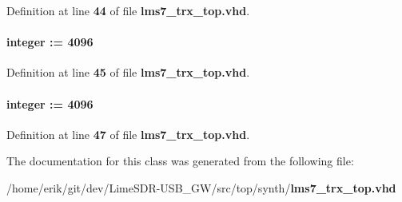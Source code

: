 Definition at line {\bf 44} of file {\bf lms7\+\_\+trx\+\_\+top.\+vhd}.

\paragraph[{T\+X\+\_\+\+P\+C\+T\+\_\+\+S\+I\+ZE}]{ {\bfseries \textcolor{vhdlchar}{ }} {\bfseries \textcolor{comment}{integer}\textcolor{vhdlchar}{ }\textcolor{vhdlchar}{ }\textcolor{vhdlchar}{\+:}\textcolor{vhdlchar}{=}\textcolor{vhdlchar}{ }\textcolor{vhdlchar}{ } \textcolor{vhdldigit}{4096} \textcolor{vhdlchar}{ }} \hspace{0.3cm}{\ttfamily [Generic]}}\label{classlms7__trx__top_a66ae1078241f8e31b80f57172b8d57d2}


Definition at line {\bf 45} of file {\bf lms7\+\_\+trx\+\_\+top.\+vhd}.

\paragraph[{W\+F\+M\+\_\+\+I\+N\+F\+I\+F\+O\+\_\+\+S\+I\+ZE}]{ {\bfseries \textcolor{vhdlchar}{ }} {\bfseries \textcolor{comment}{integer}\textcolor{vhdlchar}{ }\textcolor{vhdlchar}{ }\textcolor{vhdlchar}{\+:}\textcolor{vhdlchar}{=}\textcolor{vhdlchar}{ }\textcolor{vhdlchar}{ } \textcolor{vhdldigit}{4096} \textcolor{vhdlchar}{ }} \hspace{0.3cm}{\ttfamily [Generic]}}\label{classlms7__trx__top_ac82373300c96c816545ec5bc59aa19ba}


Definition at line {\bf 47} of file {\bf lms7\+\_\+trx\+\_\+top.\+vhd}.



The documentation for this class was generated from the following file\+:\begin{DoxyCompactItemize}
\item 
/home/erik/git/dev/\+Lime\+S\+D\+R-\/\+U\+S\+B\+\_\+\+G\+W/src/top/synth/{\bf lms7\+\_\+trx\+\_\+top.\+vhd}\end{DoxyCompactItemize}
